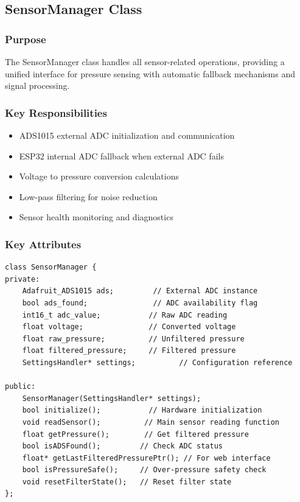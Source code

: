 \subsection{SensorManager Class}

\subsubsection{Purpose}
The SensorManager class handles all sensor-related operations, providing a unified interface for pressure sensing with automatic fallback mechanisms and signal processing.

\subsubsection{Key Responsibilities}
\begin{itemize}
    \item ADS1015 external ADC initialization and communication
    \item ESP32 internal ADC fallback when external ADC fails
    \item Voltage to pressure conversion calculations
    \item Low-pass filtering for noise reduction
    \item Sensor health monitoring and diagnostics
\end{itemize}

\subsubsection{Key Attributes}
\begin{lstlisting}[caption=SensorManager Class Structure]
class SensorManager {
private:
    Adafruit_ADS1015 ads;         // External ADC instance
    bool ads_found;               // ADC availability flag
    int16_t adc_value;           // Raw ADC reading
    float voltage;               // Converted voltage
    float raw_pressure;          // Unfiltered pressure
    float filtered_pressure;     // Filtered pressure
    SettingsHandler* settings;          // Configuration reference
    
public:
    SensorManager(SettingsHandler* settings);
    bool initialize();           // Hardware initialization
    void readSensor();          // Main sensor reading function
    float getPressure();        // Get filtered pressure
    bool isADSFound();         // Check ADC status
    float* getLastFilteredPressurePtr(); // For web interface
    bool isPressureSafe();     // Over-pressure safety check
    void resetFilterState();   // Reset filter state
};
\end{lstlisting}

